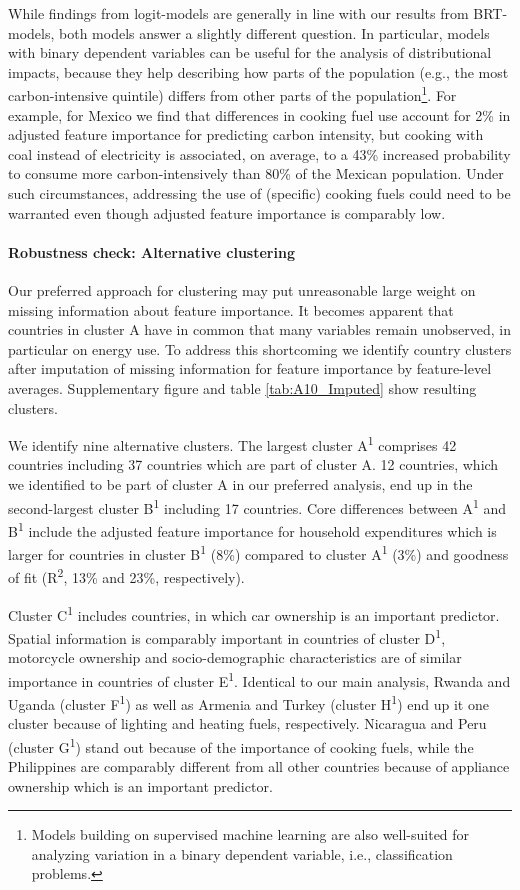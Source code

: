 \documentclass[12pt, a4paper]{article}
\begin{document}
While findings from logit-models are generally in line with our results from BRT-models, both models answer a slightly different question. In particular, models with binary dependent variables can be useful for the analysis of distributional impacts, because they help describing how parts of the population (e.g., the most carbon-intensive quintile) differs from other parts of the population\footnote{Models building on supervised machine learning are also well-suited for analyzing variation in a binary dependent variable, i.e., classification problems.}. For example, for Mexico we find that differences in cooking fuel use account for 2\% in adjusted feature importance for predicting carbon intensity, but cooking with coal instead of electricity is associated, on average, to a 43\% increased probability to consume more carbon-intensively than 80\% of the Mexican population. Under such circumstances, addressing the use of (specific) cooking fuels could need to be warranted even though adjusted feature importance is comparably low.

\paragraph{Robustness check: Alternative clustering}

Our preferred approach for clustering may put unreasonable large weight on missing information about feature importance. It becomes apparent that countries in cluster A have in common that many variables remain unobserved, in particular on energy use. To address this shortcoming we identify country clusters after imputation of missing information for feature importance by feature-level averages. Supplementary figure  and table \ref{tab:A10_Imputed} show resulting clusters.

We identify nine alternative clusters. The largest cluster A\textsuperscript{1} comprises 42 countries including 37 countries which are part of cluster A. 12 countries, which we identified to be part of cluster A in our preferred analysis, end up in the second-largest cluster B\textsuperscript{1} including 17 countries. Core differences between A\textsuperscript{1} and B\textsuperscript{1} include the adjusted feature importance for household expenditures which is larger for countries in cluster B\textsuperscript{1} (8\%) compared to cluster A\textsuperscript{1} (3\%) and goodness of fit (R\textsuperscript{2}, 13\% and 23\%, respectively).

Cluster C\textsuperscript{1} includes countries, in which car ownership is an important predictor. Spatial information is comparably important in countries of cluster D\textsuperscript{1}, motorcycle ownership and socio-demographic characteristics are of similar importance in countries of cluster E\textsuperscript{1}. Identical to our main analysis, Rwanda and Uganda (cluster F\textsuperscript{1}) as well as Armenia and Turkey (cluster H\textsuperscript{1}) end up it one cluster because of lighting and heating fuels, respectively. Nicaragua and Peru (cluster G\textsuperscript{1}) stand out because of the importance of cooking fuels, while the Philippines are comparably different from all other countries because of appliance ownership which is an important predictor.
\end{document}
